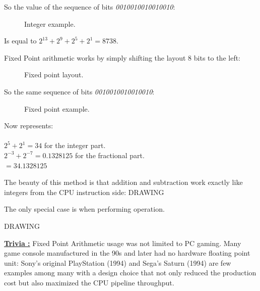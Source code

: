 \documentclass[book.tex]{subfiles}
\begin{document}
So the value of the sequence of bits \emph{0010010010010010}:
\begin{figure}[H]
\centering

 \caption{Integer example.} \label{fig:mips}
 \end{figure}

 Is equal to $ 2^{13} + 2^9 + 2^5 + 2^1 =  8738 $.

\bigskip


Fixed Point arithmetic works by simply shifting the layout 8 bits to the left:
\begin{figure}[H]
 \centering
  
 \caption{Fixed point layout.} \label{fig:mips}
\end{figure}

So the same sequence of bits \emph{0010010010010010}:
\begin{figure}[H]
 \centering
   
  \caption{Fixed point example.} \label{fig:mips}
\end{figure} 

Now represents:\\
\\
$ 2^5 + 2^1 = 34 $ for the integer part.\\
$ 2^{-3}+2^{-7} = 0.1328125 $ for the fractional part.\\
$ = 34.1328125$\\

\bigskip

The beauty of this method is that addition and subtraction work exactly like integers from the CPU instruction side:
  \bigskip
  DRAWING
  \bigskip


 The only special case is when performing operation.

\bigskip
  DRAWING
  \bigskip



 \textbf{\underline{Trivia :}}  Fixed Point Arithmetic usage was not limited to PC gaming. Many game console manufactured in the 90s and later had no hardware floating point unit: Sony's original PlayStation (1994) and Sega's Saturn (1994) are few examples among many with a design choice that not only reduced the production cost but also maximized the CPU pipeline throughput.
 
 
 
\end{document}
